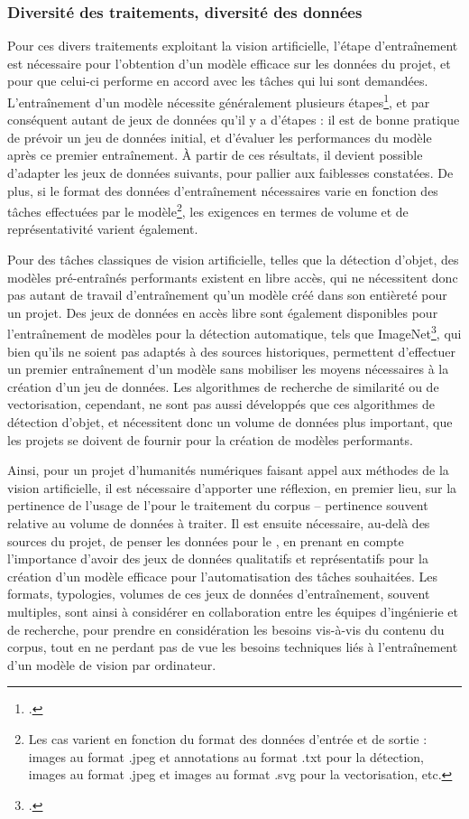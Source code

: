     \subsubsection{Diversité des traitements, diversité des données}
	Pour ces divers traitements exploitant la vision artificielle, l'étape d'entraînement est nécessaire pour l'obtention d'un modèle efficace sur les données du projet, et pour que celui-ci performe en accord avec les tâches qui lui sont demandées. L'entraînement d'un modèle nécessite généralement plusieurs étapes\footcite{strienComputerVisionHumanities2022}, et par conséquent autant de jeux de données qu'il y a d'étapes : il est de bonne pratique de prévoir un jeu de données initial, et d'évaluer les performances du modèle après ce premier entraînement. À partir de ces résultats, il devient possible d'adapter les jeux de données suivants, pour pallier aux faiblesses constatées. De plus, si le format des données d'entraînement nécessaires varie en fonction des tâches effectuées par le modèle\footnote{Les cas varient en fonction du format des données d'entrée et de sortie : images au format .jpeg et annotations au format .txt pour la détection, images au format .jpeg et images au format .svg pour la vectorisation, etc.}, les exigences en termes de volume et de représentativité varient également. 
	
	Pour des tâches classiques de vision artificielle, telles que la détection d'objet, des modèles pré-entraînés performants existent en libre accès, qui ne nécessitent donc pas autant de travail d'entraînement qu'un modèle créé dans son entièreté pour un projet. Des jeux de données en accès libre sont également disponibles pour l'entraînement de modèles pour la détection automatique, tels que ImageNet\footcite{ImageNet}, qui bien qu'ils ne soient pas adaptés à des sources historiques, permettent d'effectuer un premier entraînement d'un modèle sans mobiliser les moyens nécessaires à la création d'un jeu de données. Les algorithmes de recherche de similarité ou de vectorisation, cependant, ne sont pas aussi développés que ces algorithmes de détection d'objet, et nécessitent donc un volume de données plus important, que les projets se doivent de fournir pour la création de modèles performants.
	
	Ainsi, pour un projet d'humanités numériques faisant appel aux méthodes de la vision artificielle, il est nécessaire d'apporter une réflexion, en premier lieu, sur la pertinence de l'usage de l'\ia pour le traitement du corpus -- pertinence souvent relative au volume de données à traiter. Il est ensuite nécessaire, au-delà des sources du projet, de penser les données pour le \dl, en prenant en compte l'importance d'avoir des jeux de données qualitatifs et représentatifs pour la création d'un modèle efficace pour l'automatisation des tâches souhaitées. Les formats, typologies, volumes de ces jeux de données d'entraînement, souvent multiples, sont ainsi à considérer en collaboration entre les équipes d'ingénierie et de recherche, pour prendre en considération les besoins vis-à-vis du contenu du corpus, tout en ne perdant pas de vue les besoins techniques liés à l'entraînement d'un modèle de vision par ordinateur.